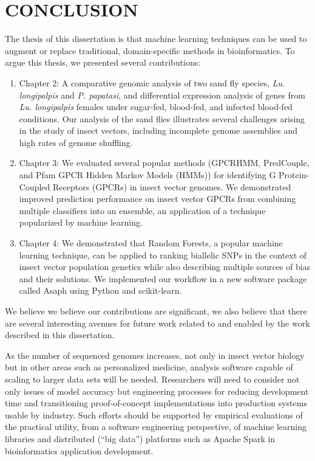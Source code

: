 \chapter{\uppercase{Conclusion}}
The thesis of this dissertation is that machine learning techniques can be used to augment or replace traditional, domain-specific methods in bioinformatics.  To argue this thesis, we presented several contributions:

\begin{enumerate}
\item Chapter 2: A comparative genomic analysis of two sand fly species, \emph{Lu. longipalpis} and \emph{P. papatasi}, and differential expression analysis of genes from \emph{Lu. longipalpis} females under sugar-fed, blood-fed, and infected blood-fed conditions. Our analysis of the sand flies illustrates several challenges arising in the study of insect vectors, including incomplete genome assemblies and high rates of genome shuffling.
\item Chapter 3: We evaluated several popular methods (GPCRHMM, PredCouple, and Pfam GPCR Hidden Markov Models (HMMs)) for identifying G Protein-Coupled Receptors (GPCRs) in insect vector genomes. We demonstrated improved prediction performance on insect vector GPCRs from combining multiple classifiers into an ensemble, an application of a technique popularized by machine learning.
\item Chapter 4: We demonstrated that Random Forests, a popular machine learning technique, can be applied to ranking biallelic SNPs in the context of insect vector population genetics while also describing multiple sources of bias and their solutions.  We implemented our workflow in a new software package called Asaph using Python and scikit-learn.
\end{enumerate}

We believe we believe our contributions are significant, we also believe that there are several interesting avenues for future work related to and enabled by the work described in this dissertation.

As the number of sequenced genomes increases, not only in insect vector biology but in other areas such as personalized medicine, analysis software capable of scaling to larger data sets will be needed.  Researchers will need to consider not only issues of model accuracy but engineering processes for reducing development time and transitioning proof-of-concept implementations into production systems usable by industry. Such efforts should be supported by empirical evaluations of the practical utility, from a software engineering perspective, of machine learning libraries and distributed (``big data'') platforms such as Apache Spark in bioinformatics application development.

